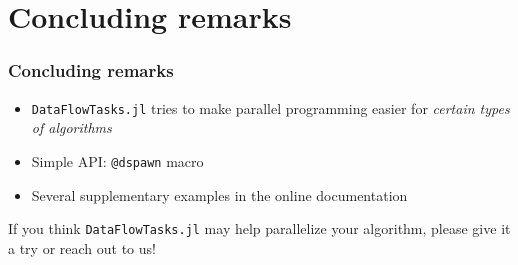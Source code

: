 \documentclass{beamer}
\newcommand{\DFT}{\texttt{DataFlowTasks.jl}}
\begin{document}
\section{Concluding remarks}



\begin{frame}
\frametitle{Concluding remarks}

\begin{itemize}
  \item \DFT{} tries to make parallel programming easier for \emph{certain types of algorithms}
  \item Simple API: \texttt{@dspawn} macro
  \item Several supplementary examples in the online documentation
\end{itemize} 

\bigskip

\begin{block}{}
\end{block}

\bigskip

\center If you think \DFT{} may help parallelize your algorithm, please give it
a try or reach out to us!

\end{frame}
\end{document}
